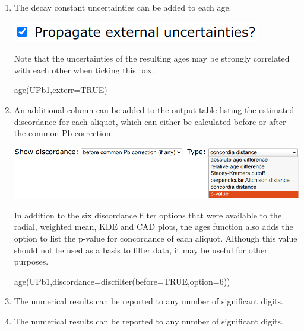\begin{refsection}
\begin{enumerate}
\item The decay constant uncertainties can be added to each age.

\noindent\begin{minipage}[t]{.35\linewidth}
\strut\vspace*{-\baselineskip}\newline
\includegraphics[width=\linewidth]{../figures/UPbAgesExterr.png}
\end{minipage}
\begin{minipage}[t]{.65\linewidth}
  Note that the uncertainties of the resulting ages may be strongly
  correlated with each other when ticking this box.
\end{minipage}
  
\begin{console}
age(UPb1,exterr=TRUE)
\end{console}

\item An additional column can be added to the output table listing
  the estimated discordance for each aliquot, which can either be
  calculated before or after the common Pb correction.
  \begin{center}
  \includegraphics[width=\linewidth]{../figures/UPbAgesDiscordance.png}
  \end{center}
  In addition to the six discordance filter options that were
  available to the radial, weighted mean, KDE and CAD plots, the ages
  function also adds the option to list the p-value for concordance of
  each aliquot. Although this value should not be used as a basis to
  filter data, it may be useful for other purposes.
  
\begin{console}
age(UPb1,discordance=discfilter(before=TRUE,option=6))
\end{console}

\item The numerical results can be reported to any number of
  significant digits.

\item The numerical results can be reported to any number of
  significant digits.


\end{enumerate}
\end{refsection}
